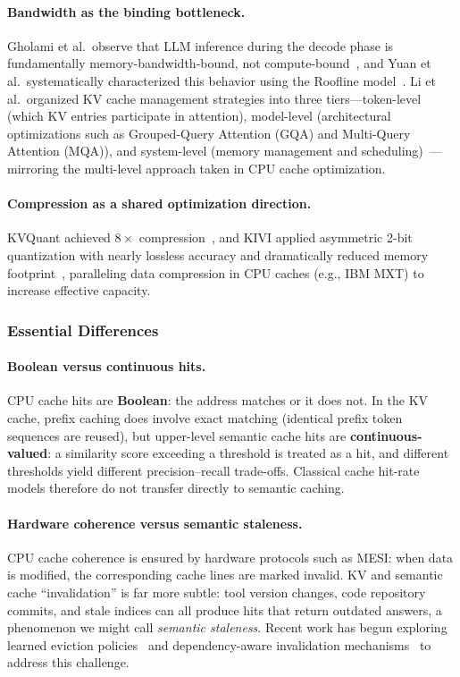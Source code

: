 \paragraph{Bandwidth as the binding bottleneck.}
Gholami et al.\ observe that LLM inference during the decode phase is fundamentally memory-bandwidth-bound, not compute-bound~\cite{gholami2024memorywall}, and Yuan et al.\ systematically characterized this behavior using the Roofline model~\cite{yuan2024llminference}.
Li et al.\ organized KV cache management strategies into three tiers---token-level (which KV entries participate in attention), model-level (architectural optimizations such as Grouped-Query Attention (GQA) and Multi-Query Attention (MQA)), and system-level (memory management and scheduling)~\cite{likvcache2024survey}---mirroring the multi-level approach taken in CPU cache optimization.

\paragraph{Compression as a shared optimization direction.}
KVQuant achieved $8\times$ compression~\cite{hooper2024kvquant}, and KIVI applied asymmetric 2-bit quantization with nearly lossless accuracy and dramatically reduced memory footprint~\cite{liu2024kivi}, paralleling data compression in CPU caches (e.g., IBM MXT) to increase effective capacity.

\subsubsection{Essential Differences}

\paragraph{Boolean versus continuous hits.}
CPU cache hits are \textbf{Boolean}: the address matches or it does not.
In the KV cache, prefix caching does involve exact matching (identical prefix token sequences are reused), but upper-level semantic cache hits are \textbf{continuous-valued}: a similarity score exceeding a threshold is treated as a hit, and different thresholds yield different precision--recall trade-offs.
Classical cache hit-rate models therefore do not transfer directly to semantic caching.

\paragraph{Hardware coherence versus semantic staleness.}
CPU cache coherence is ensured by hardware protocols such as MESI: when data is modified, the corresponding cache lines are marked invalid.
KV and semantic cache ``invalidation'' is far more subtle: tool version changes, code repository commits, and stale indices can all produce hits that return outdated answers, a phenomenon we might call \textit{semantic staleness}.
Recent work has begun exploring learned eviction policies~\cite{lpc2025} and dependency-aware invalidation mechanisms~\cite{multilevelcache2025} to address this challenge.


